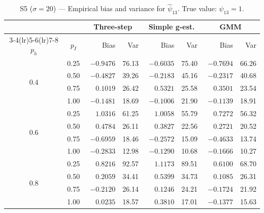 \documentclass[12pt]{article}
\begin{document}
\begin{table}[htbp]
\centering
\caption{S5 ($\sigma=20$) --- Empirical bias and variance for $\hat\psi_{13}$.
         True value: $\psi_{13}=1$.}
\label{tab:s5_psi13}
\small
\begin{tabular}{cc rr rr rr}
\toprule
& & \multicolumn{2}{c}{Three-step} & \multicolumn{2}{c}{Simple g-est.} & \multicolumn{2}{c}{GMM} \\
\cmidrule(lr){3-4}\cmidrule(lr){5-6}\cmidrule(lr){7-8}
$p_h$ & $p_I$ & Bias & Var & Bias & Var & Bias & Var \\
\midrule
\multirow{4}{*}{0.4}
 & 0.25 & $-0.9476$ & 76.13 & $-0.6035$ & 75.40 & $-0.7694$ & 66.26 \\
 & 0.50 & $-0.4827$ & 39.26 & $-0.2183$ & 45.16 & $-0.2317$ & 40.68 \\
 & 0.75 & $\phantom{-}0.1019$ & 26.42 & $\phantom{-}0.5321$ & 25.58 & $\phantom{-}0.3501$ & 23.54 \\
 & 1.00 & $-0.1481$ & 18.69 & $-0.1006$ & 21.90 & $-0.1139$ & 18.91 \\
\midrule
\multirow{4}{*}{0.6}
 & 0.25 & $\phantom{-}1.0316$ & 61.25 & $\phantom{-}1.0058$ & 55.79 & $\phantom{-}0.7272$ & 56.32 \\
 & 0.50 & $\phantom{-}0.4784$ & 26.11 & $\phantom{-}0.3827$ & 22.56 & $\phantom{-}0.2721$ & 20.52 \\
 & 0.75 & $-0.6959$ & 18.46 & $-0.2572$ & 15.09 & $-0.4633$ & 13.74 \\
 & 1.00 & $-0.2833$ & 12.98 & $-0.1290$ & 10.68 & $-0.1666$ & 10.27 \\
\midrule
\multirow{4}{*}{0.8}
 & 0.25 & $\phantom{-}0.8216$ & 92.57 & $\phantom{-}1.1173$ & 89.51 & $\phantom{-}0.6100$ & 68.70 \\
 & 0.50 & $\phantom{-}0.2059$ & 34.41 & $\phantom{-}0.5399$ & 34.73 & $\phantom{-}0.1085$ & 26.31 \\
 & 0.75 & $-0.2120$ & 26.14 & $\phantom{-}0.1246$ & 24.21 & $-0.1724$ & 21.92 \\
 & 1.00 & $\phantom{-}0.0235$ & 18.57 & $\phantom{-}0.3810$ & 17.01 & $-0.1377$ & 15.63 \\
\bottomrule
\end{tabular}
\end{table}
\end{document}
